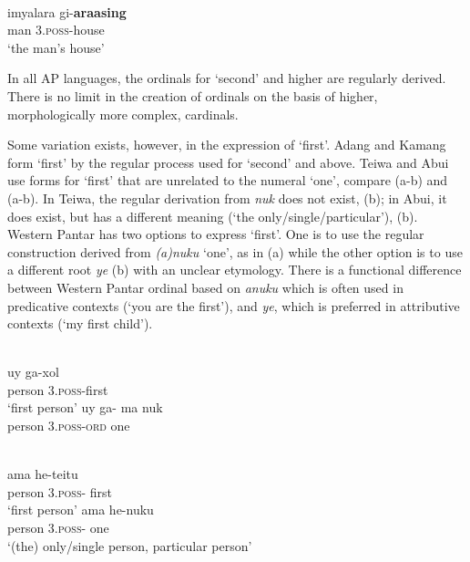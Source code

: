  

  




\ea%
\label{bkm:Ref342737790}
\\
\gll imyalara   gi-\textbf{araasing} \\  
    man    3.\textsc{poss}-house   \\
\glt`the man's house'
\z
 

In all AP languages, the ordinals for `second' and higher are regularly derived. There is no limit in the creation of ordinals on the basis of higher, morphologically more complex, cardinals.

Some variation exists, however, in the expression of `first'. Adang and Kamang form `first' by the regular process used for `second' and above. Teiwa and Abui use forms for `first' that are unrelated to the numeral `one', compare  (a-b) and  (a-b). In Teiwa, the regular derivation from \textit{nuk} does not exist, (b); in Abui, it does exist, but has a different meaning (`the only/single/particular'), (b). Western Pantar has two options to express `first'. One is to use the regular construction derived from \textit{(a)nuku} `one', as in (a) while the other option is to use a different root \textit{ye} (b) with an unclear etymology. There is a functional difference between Western Pantar ordinal based on \textit{anuku} which is often used in predicative contexts (`you are the first'), and \textit{ye}, which is preferred in attributive contexts (`my first child'). 


\ea%
\label{bkm:Ref342651040}
\\
\ea
\gll  uy    ga-xol \\  
     person    3\textsc{.poss}-first\\
\glt`first person'
\ex
\gll *uy    ga- ma    nuk\\
person    3\textsc{.poss-ord } one\\ 
\z\z
 


\ea%
\label{bkm:Ref342651068}
\\
\ea
\gll ama     he-teitu\\  
    person    3\textsc{.poss-}  first  \\
\glt`first person'
\ex
\gll ama     he-nuku\\  
  person    3\textsc{.poss- } one  \\
\glt `(the) only/single person,  particular person'
\z\z

